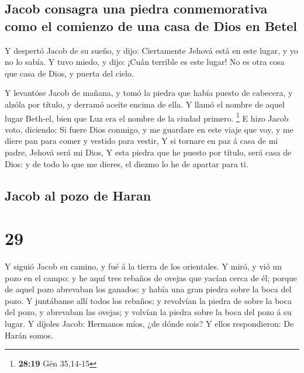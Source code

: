 \hypertarget{jacob-consagra-una-piedra-conmemorativa-como-el-comienzo-de-una-casa-de-dios-en-betel}{%
\subsection{Jacob consagra una piedra conmemorativa como el comienzo de
una casa de Dios en
Betel}\label{jacob-consagra-una-piedra-conmemorativa-como-el-comienzo-de-una-casa-de-dios-en-betel}}

 Y despertó Jacob de su sueño, y dijo: Ciertamente Jehová
está en este lugar, y yo no lo sabía.  Y tuvo miedo, y
dijo: ¡Cuán terrible es este lugar! No es otra cosa que casa de Dios, y
puerta del cielo.

 Y levantóse Jacob de mañana, y tomó la piedra que había
puesto de cabecera, y alzóla por título, y derramó aceite encima de
ella.  Y llamó el nombre de aquel lugar Beth-el, bien que
Luz era el nombre de la ciudad primero. \footnote{\textbf{28:19} Gén
  35,14-15}  E hizo Jacob voto, diciendo: Si fuere Dios
conmigo, y me guardare en este viaje que voy, y me diere pan para comer
y vestido para vestir,  Y si tornare en paz á casa de mi
padre, Jehová será mi Dios,  Y esta piedra que he puesto
por título, será casa de Dios: y de todo lo que me dieres, el diezmo lo
he de apartar para ti.

\hypertarget{jacob-al-pozo-de-haran}{%
\subsection{Jacob al pozo de Haran}\label{jacob-al-pozo-de-haran}}

\hypertarget{section-28}{%
\section{29}\label{section-28}}

 Y siguió Jacob su camino, y fué á la tierra de los
orientales.  Y miró, y vió un pozo en el campo: y he aquí
tres rebaños de ovejas que yacían cerca de él; porque de aquel pozo
abrevaban los ganados: y había una gran piedra sobre la boca del pozo.
 Y juntábanse allí todos los rebaños; y revolvían la
piedra de sobre la boca del pozo, y abrevaban las ovejas; y volvían la
piedra sobre la boca del pozo á su lugar.  Y díjoles
Jacob: Hermanos míos, ¿de dónde sois? Y ellos respondieron: De Harán
somos.

